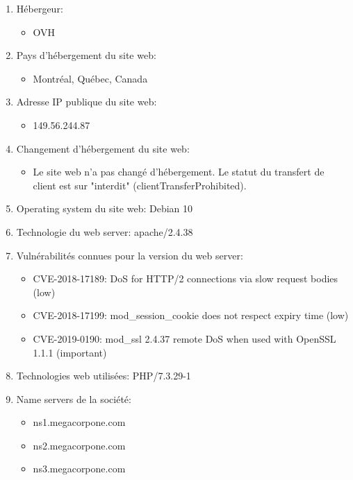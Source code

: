 \documentclass[french,paper=a4,oneside,captions=tableheading]{article}
\begin{document}
\begin{enumerate}
    \item Hébergeur:
    \begin{itemize}
        \item OVH
    \end{itemize}
    \item Pays d'hébergement du site web:
    \begin{itemize}
        \item Montréal, Québec, Canada
    \end{itemize}
    \item Adresse IP publique du site web:
    \begin{itemize}
        \item 149.56.244.87
    \end{itemize}
    \item Changement d'hébergement du site web:
    \begin{itemize}
        \item Le site web n'a pas changé d'hébergement. Le statut du transfert de client est sur "interdit" (clientTransferProhibited). \cite{1}
    \end{itemize}
    \item Operating system du site web: Debian 10
    \item Technologie du web server: apache/2.4.38
    \item Vulnérabilités connues pour la version du web server:
    \begin{itemize}
        \item CVE-2018-17189: DoS for HTTP/2 connections via slow request bodies (low)
        \item CVE-2018-17199: mod\_session\_cookie does not respect expiry time (low)
        \item CVE-2019-0190: mod\_ssl 2.4.37 remote DoS when used with OpenSSL 1.1.1 (important)
    \end{itemize}
    \item Technologies web utilisées: PHP/7.3.29-1
    \item Name servers de la société:
    \begin{itemize}
        \item ns1.megacorpone.com
        \item ns2.megacorpone.com
        \item ns3.megacorpone.com
    \end{itemize}
\end{enumerate}
\end{document}

